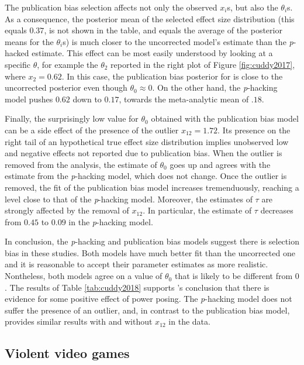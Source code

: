 \documentclass[useAMS,usenatbib,referee]{biom}
\begin{document}
The publication bias selection affects not only the observed $x_{i}$s, but also the $\theta_{i}$s. As a consequence, the posterior mean of the selected effect size distribution (this equals $0.37$, is not shown in the table, and equals the average of the posterior means for the $\theta_{i}$s) is much closer to the uncorrected model's estimate than the \textit{p}-hacked estimate. This effect can be most easily understood by looking at a specific $\theta$, for example the $\theta_2$ reported in the right plot of Figure \ref{fig:cuddy2017}, where $x_{2}=0.62$. In this case, the publication bias posterior for is close to the uncorrected posterior even though $\theta_0 \approx 0$. On the other hand, the \textit{p}-hacking model pushes $0.62$ down to $0.17$, towards the meta-analytic mean of $.18$.

Finally, the surprisingly low value for $\theta_0$ obtained with the publication bias model can be a side effect of the presence of the outlier $x_{12} = 1.72$. Its presence on the right tail of an hypothetical true effect size distribution implies unobserved low and negative effects not reported due to publication bias. When the outlier is removed from the analysis, the estimate of $\theta_{0}$ goes up and agrees with the estimate from the \textit{p}-hacking model, which does not change. Once the outlier is removed, the fit of the publication bias model increases tremenduously, reaching a level close to that of the \textit{p}-hacking model. Moreover, the estimates of $\tau$ are strongly affected by the removal of $x_{12}$. In particular, the estimate of $\tau$ decreases from $0.45$ to $0.09$ in the \textit{p}-hacking model.



In conclusion, the \textit{p}-hacking and publication bias models suggest there is selection bias in these studies. Both models have much better fit than the uncorrected one and it is reasonable to accept their parameter estimates as more realistic. Nontheless, both models agree on a value of $\theta_{0}$ that is likely to be different from $0$. The results of Table \ref{tab:cuddy2018} supports \citet{cuddy2018p}'s conclusion that there is evidence for some positive effect of power posing. The \textit{p}-hacking model does not suffer the presence of an outlier, and, in contrast to the publication bias model, provides similar results with and without $x_{12}$ in the data.

\subsection{Violent video games\label{subsec:Anderson}}
\end{document}
